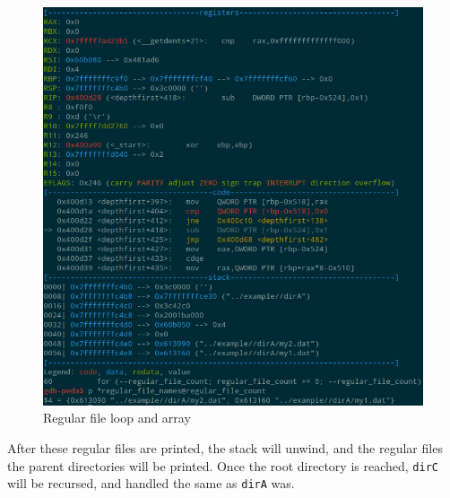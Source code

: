 \documentclass[a4paper,12pt,sffamily]{article}
\begin{document}
\begin{figure}[H]
	\centering
	\includegraphics[width=1\linewidth]{./images/11}
	\caption[regular_file_loop_array]{Regular file loop and array}
	\label{fig:11}
\end{figure}
After these regular files are printed, the stack will unwind, and the regular files the parent 
directories will be printed. Once the root directory is reached, \texttt{dirC} will be
recursed, and handled the same as \texttt{dirA} was.
\end{document}
